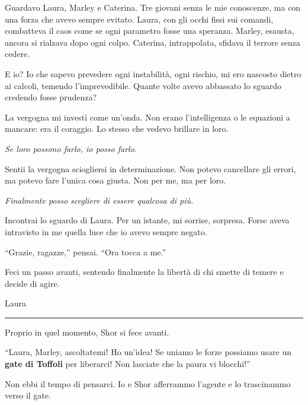 Guardavo Laura, Marley e Caterina. Tre giovani senza le mie conoscenze, ma con una forza che avevo sempre evitato. Laura, con gli occhi fissi sui comandi, combatteva il caos come se ogni parametro fosse una speranza. Marley, esausta, ancora si rialzava dopo ogni colpo. Caterina, intrappolata, sfidava il terrore senza cedere.

E io? Io che sapevo prevedere ogni instabilità, ogni rischio, mi ero nascosto dietro ai calcoli, temendo l’imprevedibile. Quante volte avevo abbassato lo sguardo credendo fosse prudenza?

La vergogna mi investì come un’onda. Non erano l’intelligenza o le equazioni a mancare: era il coraggio. Lo stesso che vedevo brillare in loro.

\textit{Se loro possono farlo, io posso farlo.}

Sentii la vergogna sciogliersi in determinazione. Non potevo cancellare gli errori, ma potevo fare l’unica cosa giusta. Non per me, ma per loro.

\textit{Finalmente posso scegliere di essere qualcosa di più.}

Incontrai lo sguardo di Laura. Per un istante, mi sorrise, sorpresa. Forse aveva intravisto in me quella luce che io avevo sempre negato.

\enquote{Grazie, ragazze,} pensai. \enquote{Ora tocca a me.}

Feci un passo avanti, sentendo finalmente la libertà di chi smette di temere e decide di agire.

\newpage
\vspace{1em} \begin{center}Laura\end{center} \hrule \vspace{1em}

Proprio in quel momento, Shor si fece avanti.

\begin{dialogue}  \enquote{Laura, Marley, ascoltatemi! Ho un'idea! Se uniamo le forze possiamo usare un \textbf{gate di Toffoli} per liberarci! Non lasciate che la paura vi blocchi!} \end{dialogue}

Non ebbi il tempo di pensarci. Io e Shor afferrammo l'agente e lo trascinammo verso il gate.


